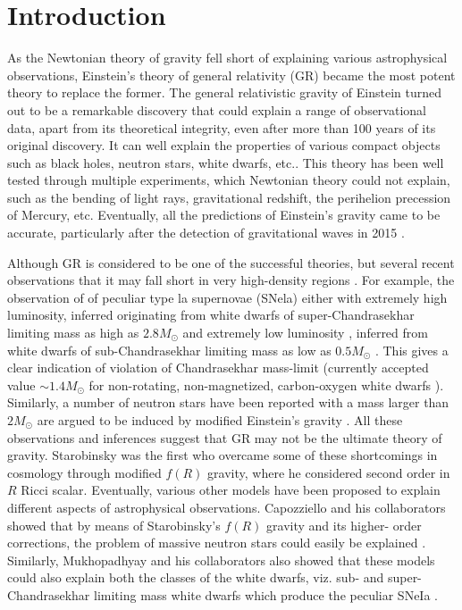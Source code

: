 \documentclass[12pt,a4paper,oneside]{book}
\begin{document}
{\hypersetup{linkcolor=black} \tableofcontents}
\mainmatter

\chapter{Introduction}
As the Newtonian theory of gravity fell short of explaining various astrophysical observations, Einstein's theory of general relativity (GR) became the most potent theory to replace the former. The general relativistic gravity of Einstein turned out to be a remarkable discovery that could explain a range of observational data, apart from its theoretical integrity, even after more than 100 years of its original discovery. It can well explain the properties of various compact objects such as black holes, neutron stars, white dwarfs, etc.\cite{Shapiro_Teukolsky_book}. This theory has been well tested through multiple experiments, which Newtonian theory could not explain, such as the bending of light rays, gravitational redshift, the perihelion precession of Mercury, etc. Eventually, all the predictions of Einstein's gravity came to be accurate, particularly after the detection of gravitational waves in 2015 \cite{GW15}.

Although GR is considered to be one of the successful theories, but several recent observations that it may fall short in very high-density regions \cite{0004-637X-517-2-565,1538-3881-116-3-1009,0004-637X-607-2-665}. For example, the observation of of peculiar type la supernovae (SNela) either with extremely high luminosity, inferred originating from white dwarfs of super-Chandrasekhar limiting mass as high as $2.8M_\odot$ \cite{2006Natur.443..308H,2010ApJ...713.1073S}  and extremely low luminosity , inferred from white dwarfs of sub-Chandrasekhar limiting mass as low as $0.5M_\odot$  \cite{1992AJ....104.1543F,1997MNRAS.284..151M,1998AJ....116.2431T,2001PASP..113..308M,2004ApJ...613.1120G,2008MNRAS.385...75T}. This gives a clear indication of violation of Chandrasekhar mass-limit (currently accepted value $\sim 1.4M_\odot$ for non-rotating, non-magnetized, carbon-oxygen white dwarfs  \cite{1931ApJ....74...81C}). Similarly, a number of neutron stars have been reported with a mass larger than $2M_\odot$ \cite{2018ApJ...859...54L,0004-637X-728-2-95}  are argued to be induced by modified Einstein's gravity \cite{2011JCAP...07..020A,2013JCAP...12..040A}. All these observations and inferences suggest that GR may not be the ultimate theory of gravity. Starobinsky was the first who overcame some of these shortcomings in cosmology through modified $f(R)$ gravity, where he considered second order in $R$ Ricci scalar. Eventually, various other models have been proposed to explain different aspects of astrophysical observations. Capozziello and his collaborators showed that by means of Starobinsky's $f(R)$ gravity and its higher-
order corrections, the problem of massive neutron stars could easily be explained \cite{2013JCAP...12..040A,2014PhRvD..89j3509A,2015JCAP...01..001A,2017CQGra..34t5008A,2016IJMPS..4160130A}. Similarly, Mukhopadhyay and his collaborators also showed that these models could also explain both the classes of the white dwarfs, viz. sub- and super-Chandrasekhar limiting mass white dwarfs which produce the peculiar SNeIa \cite{2015JCAP...05..045D,Kalita18}. 
\end{document}
